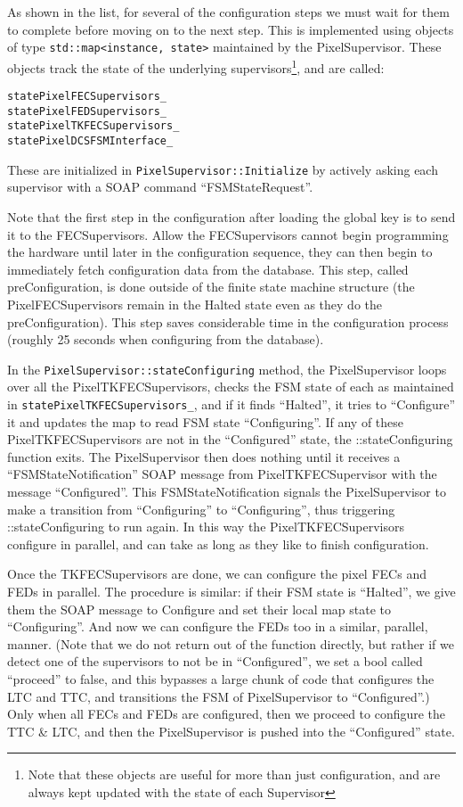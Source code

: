 As shown in the list, for several of the configuration steps we must
wait for them to complete before moving on to the next step. This is
implemented using objects of type {\tt std::map<instance, state>}
maintained by the PixelSupervisor. These objects track the state of
the underlying supervisors\footnote{Note that these objects are useful for more than just configuration, and are always kept updated with the state of each Supervisor}, and are called:
\begin{verbatim}
statePixelFECSupervisors_
statePixelFEDSupervisors_
statePixelTKFECSupervisors_
statePixelDCSFSMInterface_
\end{verbatim}

These are initialized in {\tt PixelSupervisor::Initialize} by actively
asking each supervisor with a SOAP command ``FSMStateRequest''.

Note that the first step in the configuration after loading the global key is to send it to the FECSupervisors.
Allow the FECSupervisors cannot begin programming the hardware until later in the configuration sequence, they can
then begin to immediately fetch configuration data from the database. This step, called preConfiguration, is done
outside of the finite state machine structure (the PixelFECSupervisors remain in the Halted state even as they do the
preConfiguration). This step saves considerable time in the configuration process (roughly 25 seconds when configuring
from the database).

In the {\tt PixelSupervisor::stateConfiguring} method, 
the PixelSupervisor loops over all
the PixelTKFECSupervisors, checks the FSM state of each as maintained in
{\tt statePixelTKFECSupervisors\_}, and if it finds ``Halted'', it tries to
``Configure'' it and updates the map to read FSM state ``Configuring''. 
If any of these PixelTKFECSupervisors are not in the ``Configured'' state,
the ::stateConfiguring function exits. The PixelSupervisor then does nothing until it receives a 
``FSMStateNotification'' SOAP message from PixelTKFECSupervisor with the message ``Configured''.
This FSMStateNotification signals the
PixelSupervisor to make a transition from ``Configuring'' to ``Configuring'',
thus triggering ::stateConfiguring to run again.
In this way the PixelTKFECSupervisors configure in parallel, and can take as long as they like to finish configuration.

Once the TKFECSupervisors are done, we can configure the pixel FECs and FEDs in
parallel. The procedure is similar: if their FSM state is ``Halted'', we give them
the SOAP message to Configure and set their local map state to
``Configuring''. And now we can configure the FEDs too in a similar,
parallel, manner. (Note that we do not return out of the function directly, but rather if we
detect one of the supervisors to not be in ``Configured'', we
set a bool called ``proceed'' to false, and this bypasses a large chunk
of code that configures the LTC and TTC, and transitions the FSM of
PixelSupervisor to ``Configured''.) Only when all
FECs and FEDs are configured, then we proceed to configure the TTC \& LTC, and then
the PixelSupervisor is pushed into the ``Configured'' state.

